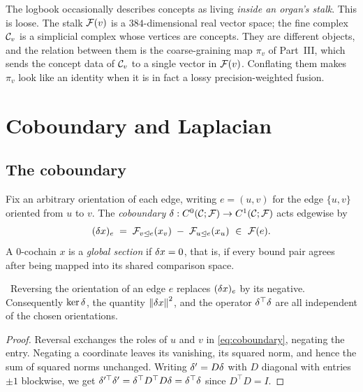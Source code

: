 \begin{remark}\label{rem:finevsstalk}
The logbook occasionally describes concepts as living \emph{inside an
organ's stalk}. This is loose. The stalk $\mathcal{F}(v)$ is a
$384$-dimensional real vector space; the fine complex $\mathcal{C}_v$ is a
simplicial complex whose vertices are concepts. They are different
objects, and the relation between them is the coarse-graining map
$\pi_v$ of Part~III, which sends the concept data of
$\mathcal{C}_v$ to a single vector in $\mathcal{F}(v)$. Conflating them makes $\pi_v$
look like an identity when it is in fact a lossy precision-weighted
fusion.
\end{remark}

\chapter{Coboundary and Laplacian}\label{ch:laplacian}

\section{The coboundary}

\begin{definition}\label{def:coboundary}
Fix an arbitrary orientation of each edge, writing $e=(u,v)$ for the
edge $\{u,v\}$ oriented from $u$ to $v$. The \emph{coboundary}
$\delta:C^{0}(\mathcal{C};\mathcal{F})\to C^{1}(\mathcal{C};\mathcal{F})$ acts edgewise by
\begin{equation}\label{eq:coboundary}
  (\delta x)_e\;=\;\mathcal{F}_{v\trianglelefteq e}(x_v)\;-\;\mathcal{F}_{u\trianglelefteq e}(x_u)
  \ \in\ \mathcal{F}(e).
\end{equation}
A $0$-cochain $x$ is a \emph{global section} if $\delta x=0$, that is, if
every bound pair agrees after being mapped into its shared comparison
space.
\end{definition}

\begin{lemma}\label{lem:orientation}
\Proved\ Reversing the orientation of an edge $e$ replaces
$(\delta x)_e$ by its negative. Consequently $\ker\delta$, the quantity
$\left\lVert \delta x \right\rVert^2$, and the operator $\delta^\top\delta$ are all independent
of the chosen orientations.
\end{lemma}
\begin{proof}
Reversal exchanges the roles of $u$ and $v$ in \eqref{eq:coboundary},
negating the entry. Negating a coordinate leaves its vanishing, its
squared norm, and hence the sum of squared norms unchanged. Writing
$\delta'=D\delta$ with $D$ diagonal with entries $\pm1$ blockwise, we get
$\delta'^\top\delta'=\delta^\top D^\top D\delta=\delta^\top\delta$ since $D^\top D=I$.
\end{proof}

